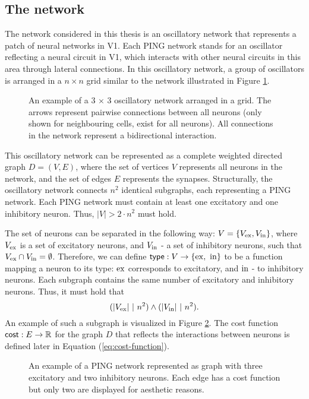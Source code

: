 \subsection{The network}
\label{sec:grid-network}

The network considered in this thesis is an oscillatory network that represents a patch of neural networks in V1. Each PING network stands for an oscillator reflecting a neural circuit in V1, which interacts with other neural circuits in this area through lateral connections.
In this oscillatory network, a group of oscillators is arranged in a $n \times n$ grid similar to the network illustrated in Figure \ref{fig:oscillatory-grid-graph}.

\begin{figure}[!htp]
    \centering
    
    \caption[Oscillatory network arranged in a grid]{An example of a 3 $\times$ 3 oscillatory network arranged in a grid. The arrows represent pairwise connections between all neurons (only shown for neighbouring cells, exist for all neurons). All connections in the network represent a bidirectional interaction.}
    \label{fig:oscillatory-grid-graph}
\end{figure}

This oscillatory network can be represented as a complete weighted directed graph $D = (V, E)$, where the set of vertices $V$ represents all neurons in the network, and the set of edges $E$ represents the synapses. Structurally, the oscillatory network connects $n^2$ identical subgraphs, each representing a PING network. Each PING network must contain at least one excitatory and one inhibitory neuron. Thus, $|V| > 2 \cdot n^2$ must hold.

The set of neurons can be separated in the following way: $V = \{ V_{\mathrm{ex}}, V_{\mathrm{in}}\}$, where $V_{\mathrm{ex}}$ is a set of excitatory neurons, and $V_{\mathrm{in}}$ - a set of inhibitory neurons, such that $V_{\mathrm{ex}} \cap V_{\mathrm{in}} = \emptyset$.
Therefore, we can define $\mathsf{type}: V \to \{ \mathrm{ex}, \ \mathrm{in} \}$ to be a function mapping a neuron to its type: $\mathrm{ex}$ corresponds to excitatory, and $\mathrm{in}$ - to inhibitory neurons. Each subgraph contains the same number of excitatory and inhibitory neurons. Thus, it must hold that
\begin{equation}
    (|V_{\mathrm{ex}}| \ | \ n^2) \land (|V_{\mathrm{in}}| \ | \ n^2).
\end{equation}
An example of such a subgraph is visualized in Figure \ref{fig:single-ping-graph}. 
The cost function $\mathsf{cost}: E \to \mathbb{R}$ for the graph $D$ that reflects the interactions between neurons is defined later in Equation (\ref{eq:cost-function}).

\begin{figure}[!htp]
    \centering
    
    \caption[PING network represented as graph]{An example of a PING network represented as graph with three excitatory and two inhibitory neurons. Each edge has a cost function but only two are displayed for aesthetic reasons.}
    \label{fig:single-ping-graph}
\end{figure}

